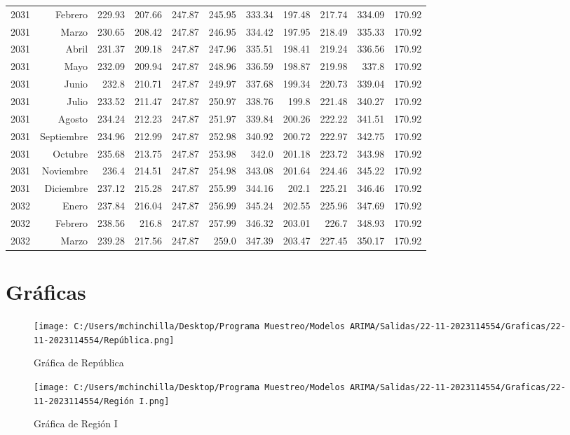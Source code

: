 \documentclass{article}%
\begin{document}
\begin{longtable}{|l r|r|r|r|r|r|r|r|r|r|}
2031&Febrero&229.93&207.66&247.87&245.95&333.34&197.48&217.74&334.09&170.92\\%
2031&Marzo&230.65&208.42&247.87&246.95&334.42&197.95&218.49&335.33&170.92\\%
2031&Abril&231.37&209.18&247.87&247.96&335.51&198.41&219.24&336.56&170.92\\%
2031&Mayo&232.09&209.94&247.87&248.96&336.59&198.87&219.98&337.8&170.92\\%
2031&Junio&232.8&210.71&247.87&249.97&337.68&199.34&220.73&339.04&170.92\\%
2031&Julio&233.52&211.47&247.87&250.97&338.76&199.8&221.48&340.27&170.92\\%
2031&Agosto&234.24&212.23&247.87&251.97&339.84&200.26&222.22&341.51&170.92\\%
2031&Septiembre&234.96&212.99&247.87&252.98&340.92&200.72&222.97&342.75&170.92\\%
2031&Octubre&235.68&213.75&247.87&253.98&342.0&201.18&223.72&343.98&170.92\\%
2031&Noviembre&236.4&214.51&247.87&254.98&343.08&201.64&224.46&345.22&170.92\\%
2031&Diciembre&237.12&215.28&247.87&255.99&344.16&202.1&225.21&346.46&170.92\\%
2032&Enero&237.84&216.04&247.87&256.99&345.24&202.55&225.96&347.69&170.92\\%
2032&Febrero&238.56&216.8&247.87&257.99&346.32&203.01&226.7&348.93&170.92\\%
2032&Marzo&239.28&217.56&247.87&259.0&347.39&203.47&227.45&350.17&170.92\\%
\hline%
\end{longtable}

%
\section{Gráficas}%
\label{sec:Grficas}%


\begin{figure}[H]%
\centering%
\texttt{[image: C:/Users/mchinchilla/Desktop/Programa Muestreo/Modelos ARIMA/Salidas/22-11-2023114554/Graficas/22-11-2023114554/República.png]}%
\caption{Gráfica de República}%
\end{figure}

%


\begin{figure}[H]%
\centering%
\texttt{[image: C:/Users/mchinchilla/Desktop/Programa Muestreo/Modelos ARIMA/Salidas/22-11-2023114554/Graficas/22-11-2023114554/Región I.png]}%
\caption{Gráfica de Región I}%
\end{figure}
\end{document}
